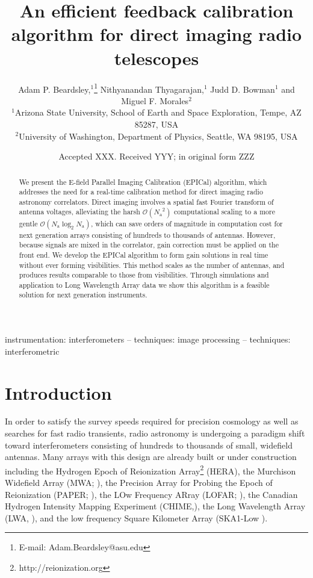\documentclass[a4paper,fleqn,usenatbib]{../mnras}
\title[EPICal]{An efficient feedback calibration algorithm for direct imaging radio telescopes
}
\author[Beardsley et al.]{
Adam P. Beardsley,$^{1}$\thanks{E-mail: Adam.Beardsley@asu.edu}
Nithyanandan Thyagarajan,$^{1}$
Judd D. Bowman$^{1}$
\newauthor
and Miguel F. Morales$^{2}$
\\
$^{1}$Arizona State University, School of Earth and Space Exploration, Tempe, AZ 85287, USA\\
$^{2}$University of Washington, Department of Physics, Seattle, WA 98195, USA\\
}
\date{Accepted XXX. Received YYY; in original form ZZZ}
\newcommand{\Nant}{\ensuremath{N_{\mathrm{a}}}}
\begin{document}
\label{firstpage}
\pagerange{\pageref{firstpage}--\pageref{lastpage}}
\maketitle

\begin{abstract}
We present the E-field Parallel Imaging Calibration (EPICal) algorithm, which addresses the need for a real-time calibration method for direct imaging radio astronomy correlators. Direct imaging involves a spatial fast Fourier transform of antenna voltages, alleviating the harsh $\mathcal{O}(\Nant^2)$ computational scaling to a more gentle $\mathcal{O}(\Nant \log_2 \Nant)$, which can save orders of magnitude in computation cost for next generation arrays consisting of hundreds to thousands of antennas. However, because signals are mixed in the correlator, gain correction must be applied on the front end. We develop the EPICal algorithm to form gain solutions in real time without ever forming visibilities. This method scales as the number of antennas, and produces results comparable to those from visibilities. Through simulations and application to Long Wavelength Array data we show this algorithm is a feasible solution for next generation instruments.
\end{abstract}

\begin{keywords}
instrumentation: interferometers -- techniques: image processing -- techniques: interferometric
\end{keywords}



\section{Introduction}
In order to satisfy the survey speeds required for precision cosmology as well as searches for fast radio transients, radio astronomy is undergoing a paradigm shift toward interferometers consisting of hundreds to thousands of small, widefield antennas. Many arrays with this design are already built or under construction including the Hydrogen Epoch of Reionization Array\footnote{http://reionization.org} (HERA), the Murchison Widefield Array (MWA; \citealt{tin13,bow13}), the Precision Array for Probing the Epoch of Reionization (PAPER; \citealt{par10}), the LOw Frequency ARray (LOFAR; \citealt{van13}), the Canadian Hydrogen Intensity Mapping Experiment (CHIME,\citealt{ban14}), the Long Wavelength Array (LWA, \citealt{ell13}), and the low frequency Square Kilometer Array (SKA1-Low \citealt{mel13}).
\end{document}
